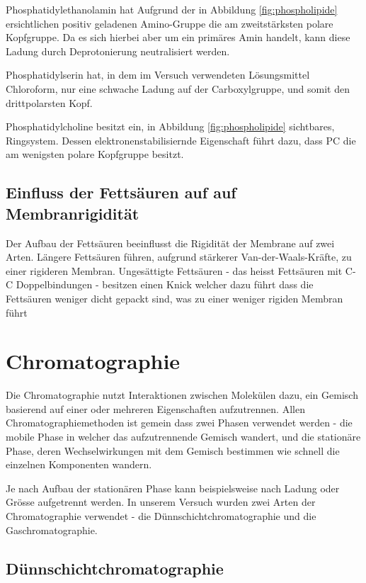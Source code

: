 \documentclass[a4paper,english]{scrreprt}
\begin{document}
Phosphatidylethanolamin hat Aufgrund der in Abbildung \ref{fig:phospholipide}
ersichtlichen positiv geladenen Amino-Gruppe die am zweitstärksten polare
Kopfgruppe. Da es sich hierbei aber um ein primäres Amin handelt, kann diese
Ladung durch Deprotonierung neutralisiert werden.

Phosphatidylserin hat, in dem im Versuch verwendeten Lösungsmittel Chloroform,
nur eine schwache Ladung auf der Carboxylgruppe, und somit den drittpolarsten
Kopf.

Phosphatidylcholine besitzt ein, in Abbildung \ref{fig:phospholipide}
sichtbares, Ringsystem. Dessen elektronenstabilisiernde Eigenschaft führt dazu,
dass PC die am wenigsten polare Kopfgruppe besitzt.

\subsection{Einfluss der Fettsäuren auf auf Membranrigidität}

Der Aufbau der Fettsäuren beeinflusst die Rigidität der Membrane auf zwei Arten.
Längere Fettsäuren führen, aufgrund stärkerer Van-der-Waals-Kräfte, zu einer
rigideren Membran. Ungesättigte Fettsäuren - das heisst Fettsäuren mit C-C
Doppelbindungen - besitzen einen Knick welcher dazu führt dass die Fettsäuren
weniger dicht gepackt sind, was zu einer weniger rigiden Membran führt

\section{Chromatographie}

Die Chromatographie nutzt Interaktionen zwischen Molekülen dazu, ein Gemisch
basierend auf einer oder mehreren Eigenschaften aufzutrennen. Allen
Chromatographiemethoden ist gemein dass zwei Phasen verwendet werden - die
mobile Phase in welcher das aufzutrennende Gemisch wandert, und die stationäre
Phase, deren Wechselwirkungen mit dem Gemisch bestimmen wie schnell die
einzelnen Komponenten wandern.

Je nach Aufbau der stationären Phase kann beispielsweise nach Ladung oder
Grösse aufgetrennt werden. In unserem Versuch wurden zwei Arten der
Chromatographie verwendet - die Dünnschichtchromatographie und die
Gaschromatographie.

\subsection{Dünnschichtchromatographie}
\end{document}
